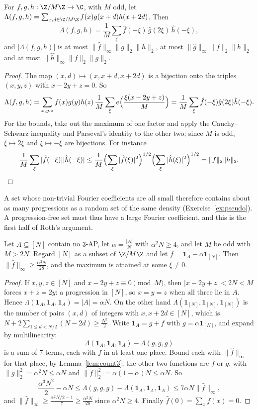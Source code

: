 \begin{lemma}\label{lem:count3}
For $f,g,h:\Z/M\Z\to\C$, with $M$ odd, let $\Lambda(f,g,h)=\sum_{x,d\in\Z/M\Z}f(x)g(x+d)h(x+2d)$. Then
\[
\Lambda(f,g,h)=\frac1M\sum_\xi\hat f(-\xi)\,\hat g(2\xi)\,\hat h(-\xi),
\]
and $|\Lambda(f,g,h)|$ is at most $\|\hat f\|_\infty\|g\|_2\|h\|_2$, at most $\|\hat g\|_\infty\|f\|_2\|h\|_2$ and at most $\|\hat h\|_\infty\|f\|_2\|g\|_2$.
\end{lemma}
\begin{proof}
The map $(x,d)\mapsto(x,x+d,x+2d)$ is a bijection onto the triples $(x,y,z)$ with $x-2y+z=0$. So
\[
\Lambda(f,g,h)=\sum_{x,y,z}f(x)g(y)h(z)\,\frac1M\sum_\xi e\Bigl(\frac{\xi(x-2y+z)}M\Bigr)=\frac1M\sum_\xi\hat f(-\xi)\hat g(2\xi)\hat h(-\xi).
\]
For the bounds, take out the maximum of one factor and apply the Cauchy--Schwarz inequality and Parseval's identity to the other two; since $M$ is odd, $\xi\mapsto2\xi$ and $\xi\mapsto-\xi$ are bijections. For instance
\[
\frac1M\sum_\xi|\hat f(-\xi)||\hat h(-\xi)|\le\frac1M\Bigl(\sum_\xi|\hat f(\xi)|^2\Bigr)^{1/2}\Bigl(\sum_\xi|\hat h(\xi)|^2\Bigr)^{1/2}=\|f\|_2\|h\|_2.
\]
\end{proof}

A set whose non-trivial Fourier coefficients are all small therefore contains about as many progressions as a random set of the same density (Exercise~\ref{ex:pseudo}). A progression-free set must thus have a large Fourier coefficient, and this is the first half of Roth's argument.

\begin{lemma}\label{lem:largecoef}
Let $A\subseteq[N]$ contain no $3$-AP, let $\alpha=\frac{|A|}N$ with $\alpha^2N\ge4$, and let $M$ be odd with $M>2N$. Regard $[N]$ as a subset of $\Z/M\Z$ and let $f=\mathbf1_A-\alpha\mathbf1_{[N]}$. Then $\|\hat f\|_\infty\ge\frac{\alpha^2N}{28}$, and the maximum is attained at some $\xi\neq0$.
\end{lemma}
\begin{proof}
If $x,y,z\in[N]$ and $x-2y+z\equiv0\pmod M$, then $|x-2y+z|<2N<M$ forces $x+z=2y$: a progression in $[N]$, so $x=y=z$ when all three lie in $A$. Hence $\Lambda(\mathbf1_A,\mathbf1_A,\mathbf1_A)=|A|=\alpha N$. On the other hand $\Lambda(\mathbf1_{[N]},\mathbf1_{[N]},\mathbf1_{[N]})$ is the number of pairs $(x,d)$ of integers with $x,x+2d\in[N]$, which is $N+2\sum_{1\le d<N/2}(N-2d)\ge\frac{N^2}2$. Write $\mathbf1_A=g+f$ with $g=\alpha\mathbf1_{[N]}$, and expand by multilinearity:
\[
\Lambda(\mathbf1_A,\mathbf1_A,\mathbf1_A)-\Lambda(g,g,g)
\]
is a sum of $7$ terms, each with $f$ in at least one place. Bound each with $\|\hat f\|_\infty$ for that place, by Lemma~\ref{lem:count3}; the other two functions are $f$ or $g$, with $\|g\|_2^2=\alpha^2N\le\alpha N$ and $\|f\|_2^2=\alpha(1-\alpha)N\le\alpha N$. So
\[
\frac{\alpha^3N^2}2-\alpha N\le\Lambda(g,g,g)-\Lambda(\mathbf1_A,\mathbf1_A,\mathbf1_A)\le7\alpha N\|\hat f\|_\infty,
\]
and $\|\hat f\|_\infty\ge\frac{\alpha^2N/2-1}7\ge\frac{\alpha^2N}{28}$ since $\alpha^2N\ge4$. Finally $\hat f(0)=\sum_xf(x)=0$.
\end{proof}

